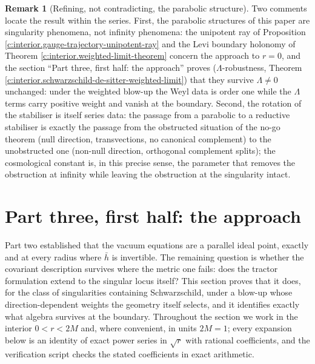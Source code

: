 \documentclass[11pt]{article}
\theoremstyle{definition}
\newtheorem{remark}[theorem]{Remark}
\theoremstyle{plain}
\providecommand{\hb}{}\renewcommand{\hb}{\bar{h}}
\begin{document}
\begin{remark}[Refining, not contradicting, the parabolic structure]\label{c:note.interior.refining-not-contradicting-parabolic-structure}
Two comments locate the result within the series. First, the parabolic structures of this paper are singularity phenomena, not infinity phenomena: the unipotent ray of Proposition \ref{c:interior.gauge-trajectory-unipotent-ray} and the Levi boundary holonomy of Theorem \ref{c:interior.weighted-limit-theorem} concern the approach to $r = 0$, and the section ``Part three, first half: the approach'' proves ($\Lambda$-robustness, Theorem \ref{c:interior.schwarzschild-de-sitter-weighted-limit}) that they survive $\Lambda \neq 0$ unchanged: under the weighted blow-up the Weyl data is order one while the $\Lambda$ terms carry positive weight and vanish at the boundary. Second, the rotation of the stabiliser is itself series data: the passage from a parabolic to a reductive stabiliser is exactly the passage from the obstructed situation of the no-go theorem (null direction, transvections, no canonical complement) to the unobstructed one (non-null direction, orthogonal complement splits); the cosmological constant is, in this precise sense, the parameter that removes the obstruction at infinity while leaving the obstruction at the singularity intact.
\end{remark}

\section{Part three, first half: the approach}

\label{c:note.interior.setting-part-three-first-half-approach}
Part two established that the vacuum equations are a parallel ideal point, exactly and at every radius where $\hb$ is invertible. The remaining question is whether the covariant description survives where the metric one fails: does the tractor formulation extend to the singular locus itself? This section proves that it does, for the class of singularities containing Schwarzschild, under a blow-up whose direction-dependent weights the geometry itself selects, and it identifies exactly what algebra survives at the boundary. Throughout the section we work in the interior $0 < r < 2M$ and, where convenient, in units $2M = 1$; every expansion below is an identity of exact power series in $\sqrt{r}$ with rational coefficients, and the verification script checks the stated coefficients in exact arithmetic.
\end{document}
